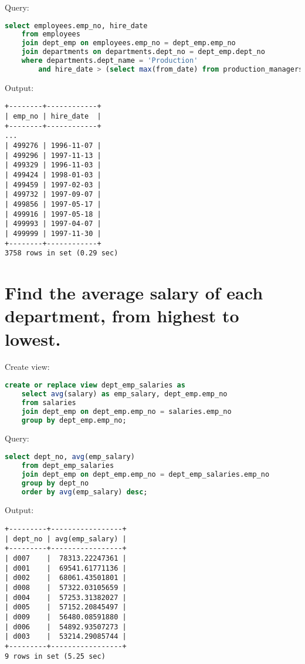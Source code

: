 \documentclass[12pt]{article}
\begin{document}
Query:

\begin{lstlisting}[language=SQL]
select employees.emp_no, hire_date
    from employees
    join dept_emp on employees.emp_no = dept_emp.emp_no
    join departments on departments.dept_no = dept_emp.dept_no
    where departments.dept_name = 'Production'
        and hire_date > (select max(from_date) from production_managers);
\end{lstlisting}

Output:

\begin{verbatim}
+--------+------------+
| emp_no | hire_date  |
+--------+------------+
...
| 499276 | 1996-11-07 |
| 499296 | 1997-11-13 |
| 499329 | 1996-11-03 |
| 499424 | 1998-01-03 |
| 499459 | 1997-02-03 |
| 499732 | 1997-09-07 |
| 499856 | 1997-05-17 |
| 499916 | 1997-05-18 |
| 499993 | 1997-04-07 |
| 499999 | 1997-11-30 |
+--------+------------+
3758 rows in set (0.29 sec)
\end{verbatim}


\section{Find the average salary of each department, from highest to lowest.}

Create view:
\begin{lstlisting}[language=SQL]
create or replace view dept_emp_salaries as
    select avg(salary) as emp_salary, dept_emp.emp_no
    from salaries
    join dept_emp on dept_emp.emp_no = salaries.emp_no
    group by dept_emp.emp_no;
\end{lstlisting}

Query:

\begin{lstlisting}[language=SQL]
select dept_no, avg(emp_salary)
    from dept_emp_salaries
    join dept_emp on dept_emp.emp_no = dept_emp_salaries.emp_no
    group by dept_no
    order by avg(emp_salary) desc;
\end{lstlisting}

Output:

\begin{verbatim}
+---------+-----------------+
| dept_no | avg(emp_salary) |
+---------+-----------------+
| d007    |  78313.22247361 |
| d001    |  69541.61771136 |
| d002    |  68061.43501801 |
| d008    |  57322.03105659 |
| d004    |  57253.31382027 |
| d005    |  57152.20845497 |
| d009    |  56480.08591880 |
| d006    |  54892.93507273 |
| d003    |  53214.29085744 |
+---------+-----------------+
9 rows in set (5.25 sec)
\end{verbatim}
\end{document}
